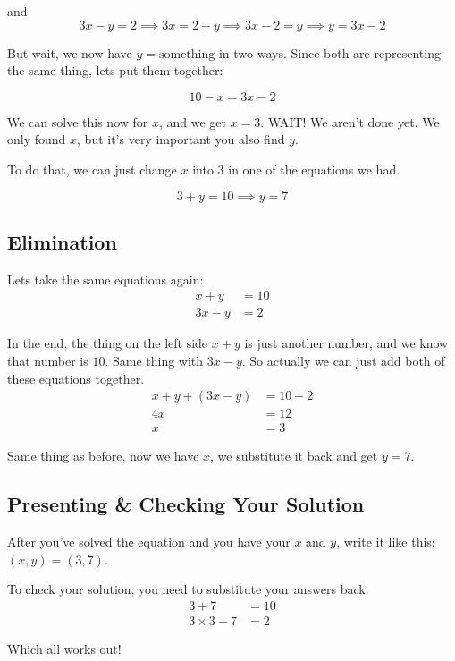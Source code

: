 \documentclass{article}
\theoremstyle{mytheoremstyle}
\theoremstyle{mytheoremstyle}
\theoremstyle{myproblemstyle}
\theoremstyle{myproblemstyle}
\begin{document}
    and 
    \[3x - y = 2 \implies 3x = 2 + y \implies 3x - 2 = y \implies y = 3x - 2\]

    But wait, we now have $y = \text{something}$ in two ways. Since both are representing the same thing, lets put them together:

    \[10 - x = 3x - 2\]

    We can solve this now for $x$, and we get $x = 3$. WAIT! We aren't done yet. We only found $x$, but it's very important you also find $y$.

    To do that, we can just change $x$ into $3$ in one of the equations we had.

    \[3 + y = 10 \implies y = 7\]

    \subsection{Elimination}

    Lets take the same equations again:
    \begin{align*}
        x + y &= 10 \\
        3x - y &= 2
    \end{align*}

    In the end, the thing on the left side $x+y$ is just another number, and we know that number is $10$. Same thing with $3x - y$. So actually we can just add both of these equations together.
    \begin{align*}
        x + y + (3x - y) &= 10 + 2 \\
        4x &= 12 \\
        x &= 3
    \end{align*}

    Same thing as before, now we have $x$, we substitute it back and get $y = 7$.

    \subsection{Presenting \& Checking Your Solution}
    After you've solved the equation and you have your $x$ and $y$, write it like this: $(x, y) = (3, 7)$.

    To check your solution, you need to substitute your answers back.
    \begin{align*}
        3 + 7 &= 10 \\
        3 \times 3 - 7 &= 2
    \end{align*}

    Which all works out!
\end{document}
